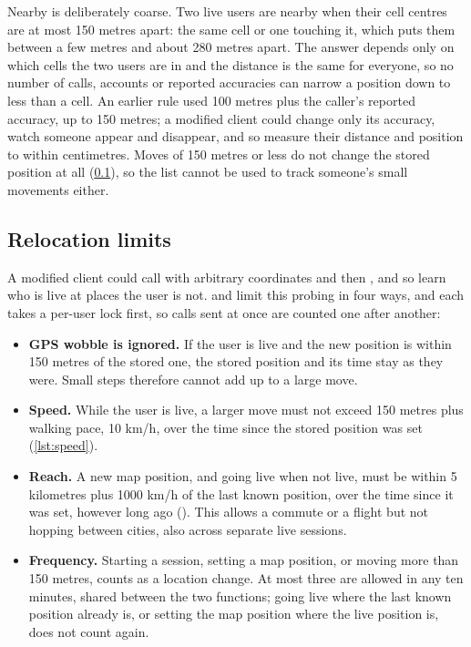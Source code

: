 Nearby is deliberately coarse. Two live users are nearby when their cell centres are at most 150 metres
apart: the same cell or one touching it, which puts them between a few metres and about 280 metres
apart. The answer depends only on which cells the two users are in and the distance is the same for
everyone, so no number of calls, accounts or reported accuracies can narrow a position down to less
than a cell. An earlier rule used 100 metres plus the caller's reported accuracy, up to 150 metres; a
modified client could change only its accuracy, watch someone appear and disappear, and so measure their
distance and position to within centimetres. Moves of 150 metres or less do not change the stored
position at all (\cref{sec:relocation-limits}), so the list cannot be used to track someone's small
movements either.

\subsection{Relocation limits}
\label{sec:relocation-limits}

A modified client could call  with arbitrary coordinates and then , and so
learn who is live at places the user is not.  and  limit this
probing in four ways, and each takes a per-user lock first, so calls sent at once are counted one after
another:

\begin{itemize}
  \item \textbf{GPS wobble is ignored.} If the user is live and the new position is within 150 metres of
    the stored one, the stored position and its time stay as they were. Small steps therefore cannot add
    up to a large move.
  \item \textbf{Speed.} While the user is live, a larger move must not exceed 150 metres plus walking pace,
    10 km/h, over the time since the stored position was set (\cref{lst:speed}).
  \item \textbf{Reach.} A new map position, and going live when not live, must be within 5 kilometres plus
    1000 km/h of the last known position, over the time since it was set, however long ago
    (). This allows a commute or a flight but not hopping between cities, also
    across separate live sessions.
  \item \textbf{Frequency.} Starting a session, setting a map position, or moving more than 150 metres,
    counts as a location change. At most three are allowed in any ten minutes, shared between the two
    functions; going live where the last known position already is, or setting the map position where
    the live position is, does not count again.
\end{itemize}

